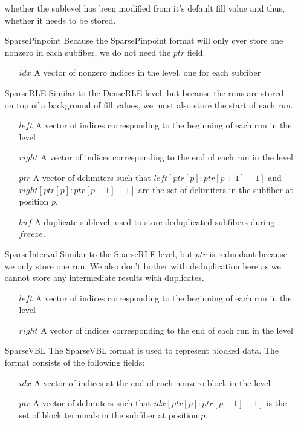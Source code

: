 \begin{enumerate}
    whether the sublevel has been modified from it's default fill value and
    thus, whether it needs to be stored.
\item[SparsePinpoint]
    Because the SparsePinpoint format will only ever store one nonzero in each subfiber,
    we do not need the $ptr$ field.
    \begin{enumerate}
        \item[$idx$] A vector of nonzero indices in the level, one for each subfiber
    \end{enumerate}
\item[SparseRLE]
    Similar to the DenseRLE level, but because the runs are stored on top of a background of fill values, we must also store the start of each run.
    \begin{enumerate}
        \item[$left$] A vector of indices corresponding to the beginning of each run in the level
        \item[$right$] A vector of indices corresponding to the end of each run in the level
        \item[$ptr$] A vector of delimiters such that $left[ptr[p]:ptr[p+1] - 1]$ and $right[ptr[p]:ptr[p+1] - 1]$ are the set of delimiters in the subfiber at position $p$.
        \item[$buf$] A duplicate sublevel, used to store deduplicated subfibers during $freeze$.
    \end{enumerate}
\item[SparseInterval]
    Similar to the SparseRLE level, but $ptr$ is redundant because we only store
    one run. We also don't bother with deduplication here as we cannot store any
    intermediate results with duplicates.
    \begin{enumerate}
        \item[$left$] A vector of indices corresponding to the beginning of each run in the level
        \item[$right$] A vector of indices corresponding to the end of each run in the level
    \end{enumerate}
\item[SparseVBL]
    The SparseVBL format is used to represent blocked data. The format consists
    of the following fields:
    \begin{enumerate}
        \item[$idx$] A vector of indices at the end of each nonzero block in the level
        \item[$ptr$] A vector of delimiters such that $idx[ptr[p]:ptr[p+1] - 1]$ is the set of block terminals in the subfiber at position $p$.

\end{enumerate}
\end{enumerate}
